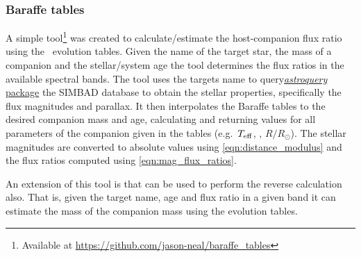 \subsubsection{Baraffe tables}
\label{subsubsec:baraffe_tables_code}
A simple tool\footnote{Available at \href{https://github.com/jason-neal/baraffe_tables}{https://github.com/jason-neal/baraffe\_tables}} was created to calculate/estimate the host-companion flux ratio using the~\citet{baraffe_evolutionary_2003, baraffe_new_2015} evolution tables.
Given the name of the target star, the mass of a companion and the stellar/system age the tool determines the flux ratios in the available spectral bands.
The tool uses the targets name to query\href{https://zenodo.org/record/1160627}{\emph{astroquery} package} the {SIMBAD} database to obtain the stellar properties, specifically the flux magnitudes and parallax.
It then interpolates the Baraffe tables to the desired companion mass and age, calculating and returning values for all parameters of the companion given in the tables (e.g.\ \(T_{\mathrm{eff}}\), \logg, \(R/R_{\odot}\)).
The stellar magnitudes are converted to absolute values using \cref{eqn:distance_modulus} and the flux ratios computed using \cref{eqn:mag_flux_ratios}.

An extension of this tool is that can be used to perform the reverse calculation also.
That is, given the target name, age and flux ratio in a given band it can estimate the mass of the companion mass using the evolution tables.

